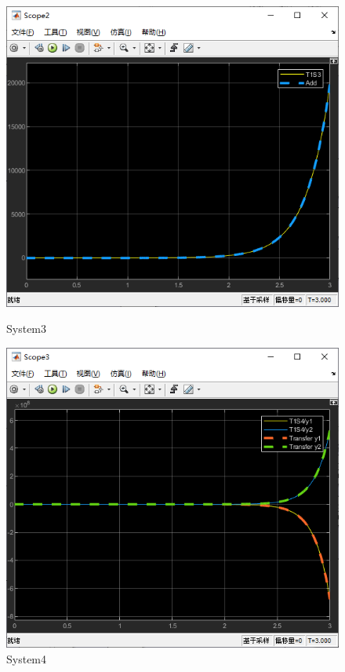 \documentclass[12pt,a4paper,oneside]{ctexart}
\begin{document}
    \newpage
    \begin{figure}[H]
        \centering
        \includegraphics[height = 0.4\textheight]{../screenshots/MT1S3Result.PNG}
        \caption{System3}
        \includegraphics[height = 0.4\textheight]{../screenshots/MT1S4Result.PNG}
        \caption{System4}
    \end{figure}
    \newpage
\end{document}
